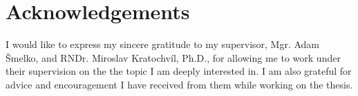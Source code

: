 \vfill

\vglue 15cm

\section*{Acknowledgements}
I would like to express my sincere gratitude to my supervisor, Mgr. Adam Šmelko, and RNDr. Miroslav Kratochvíl, Ph.D., for allowing me to work under their supervision on the the topic I am deeply interested in. I am also grateful for advice and encouragement I have received from them while working on the thesis. 

